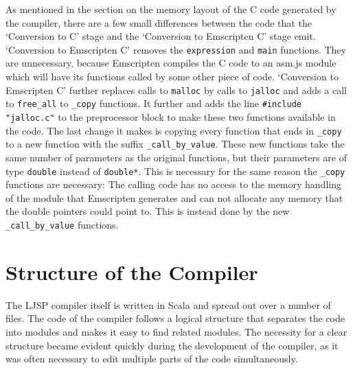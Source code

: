 \documentclass[11pt]{report}
\begin{document}
As mentioned in the section on the memory layout of the C code generated by the compiler, there are a few small differences between the code that the `Conversion to C' stage and the `Conversion to Emscripten C' stage emit. `Conversion to Emscripten C' removes the \texttt{expression} and \texttt{main} functions. They are unnecessary, because Emscripten compiles the C code to an asm.js module which will have its functions called by some other piece of code. `Conversion to Emscripten C' further replaces calls to \texttt{malloc} by calls to \texttt{jalloc} and adds a call to \texttt{free_all} to \texttt{_copy} functions. It further and adds the line \texttt{\#include "jalloc.c"} to the preprocessor block to make these two functions available in the code. The last change it makes is copying every function that ends in \texttt{_copy} to a new function with the suffix \texttt{_call_by_value}. These new functions take the same number of parameters as the original functions, but their parameters are of type \texttt{double} instead of \texttt{double*}. This is necessary for the same reason the \texttt{_copy} functions are necessary: The calling code has no access to the memory handling of the module that Emscripten generates and can not allocate any memory that the double pointers could point to. This is instead done by the new \texttt{_call_by_value} functions.

\section{Structure of the Compiler}
The LJSP compiler itself is written in Scala and spread out over a number of files. The code of the compiler follows a logical structure that separates the code into modules and makes it easy to find related modules. The necessity for a clear structure became evident quickly during the development of the compiler, as it was often necessary to edit multiple parts of the code simultaneously.
\end{document}

